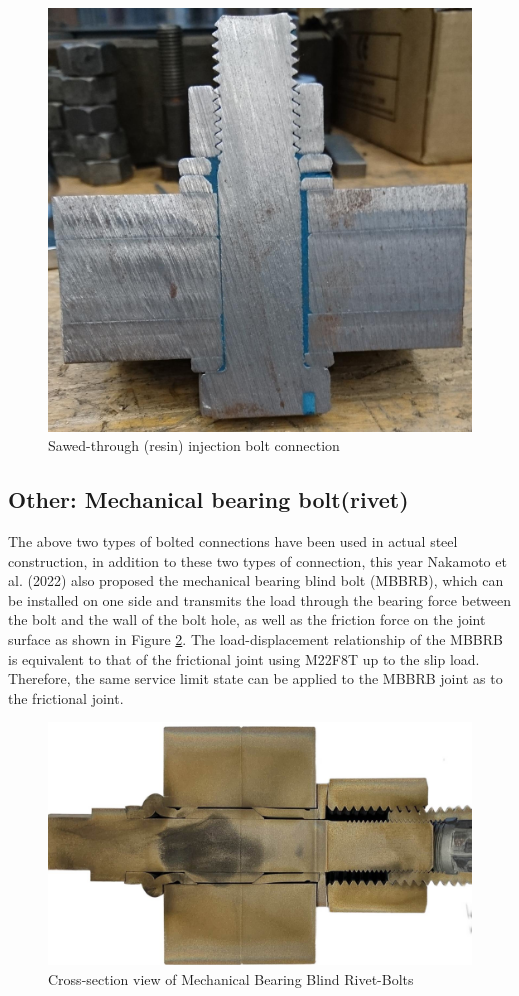 \begin{figure}
    \centering
    \includegraphics[width=0.85\linewidth]{imgs//ch2/resin-bolt.jpg}
    \caption{Sawed-through (resin) injection bolt connection \cite{Axel2017injbolt}}
    \label{fig-resinbolt}
\end{figure}

\subsection{Other: Mechanical bearing bolt(rivet)}

The above two types of bolted connections have been used in actual steel construction, in addition to these two types of connection, this year Nakamoto et al. (2022) \cite{Nakamoto2022MBBRB} also proposed the mechanical bearing blind bolt (MBBRB), which can be installed on one side and transmits the load through the bearing force between the bolt and the wall of the bolt hole, as well as the friction force on the joint surface as shown in Figure \ref{fig-MBBRB}. The load-displacement relationship of the MBBRB is equivalent to that of the frictional joint using M22F8T up to the slip load. Therefore, the same service limit state can be applied to the MBBRB joint as to the frictional joint.


\begin{figure}
    \centering
    \includegraphics[width=0.85\linewidth]{imgs//ch2/onesidebearingbolt.jpg}
    \caption{Cross-section view of Mechanical Bearing Blind Rivet-Bolts}
    \label{fig-MBBRB}
\end{figure}


